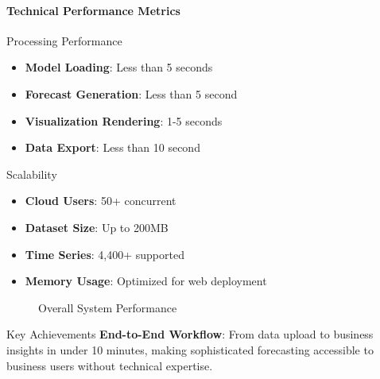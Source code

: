 { 
	\framesubtitle{Technical Performance Metrics}
	
	\begin{block}{Processing Performance}
		\begin{itemize}
			\item \textbf{Model Loading}: Less than 5 seconds
			\item \textbf{Forecast Generation}: Less than 5 second
			\item \textbf{Visualization Rendering}: 1-5 seconds
			\item \textbf{Data Export}: Less than 10 second
		\end{itemize}
	\end{block}
	
	\begin{block}{Scalability}
		\begin{itemize}
			\item \textbf{Cloud Users}: 50+ concurrent
			\item \textbf{Dataset Size}: Up to 200MB
			\item \textbf{Time Series}: 4,400+ supported
			\item \textbf{Memory Usage}: Optimized for web deployment
		\end{itemize}
	\end{block}
	
	\begin{figure}
		\centering
		
		\caption{Overall System Performance}
	\end{figure}
	
	\begin{exampleblock}{Key Achievements}
		\textbf{End-to-End Workflow}: From data upload to business insights in under 10 minutes, 
		making sophisticated forecasting accessible to business users without technical expertise.
	\end{exampleblock}
}


